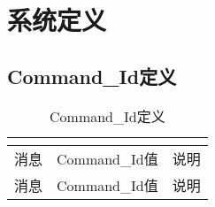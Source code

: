 \documentclass[11pt]{book} %
\begin{document}
\section{系统定义}




\subsection{Command\_Id定义}


\begin{longtable}{|m{200pt}|m{80pt}|m{120pt}|}
\multicolumn{3}{r}{}
\tabularnewline\hline
消息&Command\_Id值&说明
\endhead

\caption{Command\_Id定义}\\
\hline
消息&Command\_Id值&说明
\endfirsthead

\multicolumn{3}{r}{}
\endfoot

\endlastfoot


\end{longtable}
\end{document}
